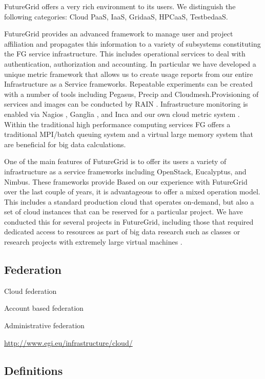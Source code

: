 \documentclass{tex/sig-alternate-2013}
\begin{document}
FutureGrid offers a very rich environment to its users. We distinguish the following categories: Cloud PaaS, IaaS, GridaaS, HPCaaS, TestbedaaS.

FutureGrid provides an advanced framework to manage user and project affiliation and propagates this information to a variety of subsystems constituting the FG service infrastructure. This includes operational services to deal with authentication, authorization and accounting. In particular we have developed a unique metric framework that allows us to create usage reports from our entire Infrastructure as a Service frameworks. Repeatable experiments can be created with a number of tools including Pegasus, Precip and Cloudmesh.Provisioning of services and images can be conducted by RAIN \cite{imagemanagement,fg-1295}. Infrastructure monitoring is enabled via Nagios \cite{nagios}, Ganglia \cite{ganglia}, and Inca \cite{inca} and our own cloud metric system \cite{las08federated-cloud}.
Within the traditional high performance computing services FG offers a traditional MPI/batch queuing system and a virtual large memory system that are beneficial for big data calculations.


One of the main features of FutureGrid is to offer its users a variety
of infrastructure as a service frameworks
\cite{comparisoncloud,las2011virt} including OpenStack, Eucalyptus,
and Nimbus. These frameworks provide Based on our experience
with FutureGrid over the last couple of years, it is advantageous to
offer a mixed operation model. This includes a standard production
cloud that operates on-demand, but also a set of cloud instances that
can be reserved for a particular project. We have conducted this for
several projects in FutureGrid, including those that required
dedicated access to resources as part of big data research such as
classes \cite{fg405,fg368} or research projects with extremely large
virtual machines \cite{fg298}.


\subsection{Federation}

Cloud federation

Account based federation

Administrative federation

\url{http://www.egi.eu/infrastructure/cloud/}


\cite{kurze2011cloudfederation}


\subsection{Definitions}
\end{document}
